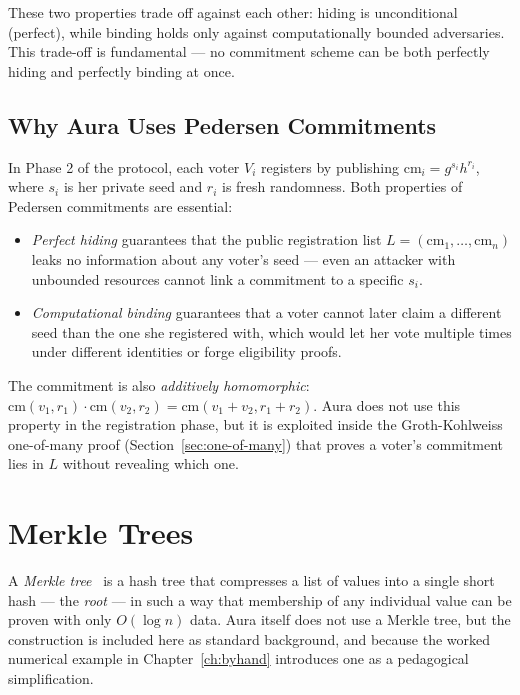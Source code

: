 \documentclass[12pt,a4paper,oneside]{report}
\begin{document}
These two properties trade off against each other: hiding is unconditional 
(perfect), while binding holds only against computationally bounded 
adversaries. This trade-off is fundamental --- no commitment scheme can 
be both perfectly hiding and perfectly binding at once.

\subsection*{Why Aura Uses Pedersen Commitments}
In Phase 2 of the protocol, each voter $V_i$ registers by publishing 
$\text{cm}_i = g^{s_i} h^{r_i}$, where $s_i$ is her private seed and 
$r_i$ is fresh randomness. Both properties of Pedersen commitments are 
essential:

\begin{itemize}
    \item \textit{Perfect hiding} guarantees that the public registration 
    list $L = (\text{cm}_1, \ldots, \text{cm}_n)$ leaks no information 
    about any voter's seed --- even an attacker with unbounded resources 
    cannot link a commitment to a specific $s_i$.
    \item \textit{Computational binding} guarantees that a voter cannot 
    later claim a different seed than the one she registered with, which 
    would let her vote multiple times under different identities or 
    forge eligibility proofs.
\end{itemize}

The commitment is also \textit{additively homomorphic}: 
$\text{cm}(v_1, r_1) \cdot \text{cm}(v_2, r_2) = \text{cm}(v_1 + v_2, r_1 + r_2)$. 
Aura does not use this property in the registration phase, but it is 
exploited inside the Groth-Kohlweiss one-of-many proof 
(Section~\ref{sec:one-of-many}) that proves a voter's commitment lies 
in $L$ without revealing which one.
\section{Merkle Trees}
\label{sec:merkle-trees}

A \textit{Merkle tree}~\cite{merkle} is a hash tree that compresses a list 
of values into a single short hash --- the \textit{root} --- in such a way 
that membership of any individual value can be proven with only 
$O(\log n)$ data. Aura itself does not use a Merkle tree, but the 
construction is included here as standard background, and because the 
worked numerical example in Chapter~\ref{ch:byhand} introduces one as a 
pedagogical simplification.
\end{document}
